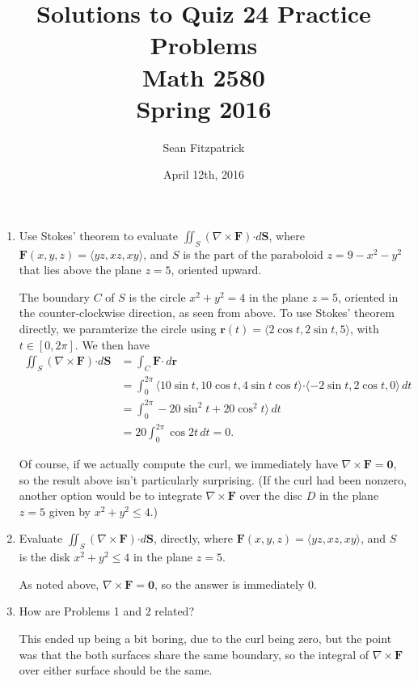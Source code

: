 \documentclass[letterpaper,12pt]{article}
\title{Solutions to Quiz 24 Practice Problems\\Math 2580\\Spring 2016}
\author{Sean Fitzpatrick}
\date{April 12th, 2016}
\renewcommand{\r}{\mathbf{r}}
\newcommand{\dotp}{\boldsymbol{\cdot}}
\newcommand{\F}{\mathbf{F}}
\renewcommand{\S}{\mathbf{S}}
\begin{document}
 \maketitle

\begin{enumerate}
 \item Use Stokes' theorem to evaluate $\iint_S(\nabla\times \F)\dotp d\mathbf{S}$, where $\F(x,y,z)=\langle yz, xz, xy\rangle$, and $S$ is the part of the paraboloid $z=9-x^2-y^2$ that lies above the plane $z=5$, oriented upward.

\bigskip

The boundary $C$ of $S$ is the circle $x^2+y^2=4$ in the plane $z=5$, oriented in the counter-clockwise direction, as seen from above. To use Stokes' theorem directly, we paramterize the circle using $\r(t) = \langle 2\cos t, 2\sin t, 5\rangle$, with $t\in [0,2\pi]$. We then have
\begin{align*}
 \iint_S(\nabla \times \F)\dotp d\S & = \int_C \F\dotp \,d\r\\
& = \int_0^{2\pi} \langle 10\sin t, 10\cos t, 4\sin t\cos t\rangle\dotp \langle -2\sin t, 2\cos t, 0\rangle \,dt\\
& = \int_0^{2\pi} -20\sin^2 t+20\cos^2t\rangle\,dt\\
& = 20\int_0^{2\pi}\cos 2t\,dt = 0.
\end{align*}

Of course, if we actually compute the curl, we immediately have $\nabla\times\F = \mathbf{0}$, so the result above isn't particularly surprising. (If the curl had been nonzero, another option would be to integrate $\nabla\times\F$ over the disc $D$ in the plane $z=5$ given by $x^2+y^2\leq 4$.)



 \item Evaluate $\iint_S(\nabla\times \F)\dotp d\mathbf{S}$, directly, where $\F(x,y,z)=\langle yz, xz, xy\rangle$, and $S$ is the disk $x^2+y^2\leq 4$ in the plane $z=5$.

\bigskip

As noted above, $\nabla \times \F=\mathbf{0}$, so the answer is immediately 0. 

 \item How are Problems 1 and 2 related?

\bigskip

This ended up being a bit boring, due to the curl being zero, but the point was that the both surfaces share the same boundary, so the integral of $\nabla\times \F$ over either surface should be the same.


\end{enumerate}
\end{document}
